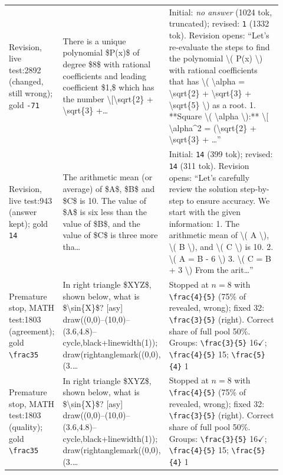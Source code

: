 \begin{tabular}{@{}>{\raggedright\arraybackslash}p{0.16\linewidth}>{\raggedright\arraybackslash}p{0.28\linewidth}>{\raggedright\arraybackslash}p{0.48\linewidth}@{}}
Revision, live test:2892 (changed, still wrong); gold \texttt{-71} & There is a unique polynomial \$P(x)\$ of degree \$8\$ with rational coefficients and leading coefficient \$1,\$ which has the number \textbackslash{}[\textbackslash{}sqrt\{2\} + \textbackslash{}sqrt\{3\} +\ldots & Initial: \textit{no answer} (1024 tok, truncated); revised: \texttt{1} (1332 tok). Revision opens: ``Let's re-evaluate the steps to find the polynomial \textbackslash{}( P(x) \textbackslash{}) with rational coefficients that has \textbackslash{}( \textbackslash{}alpha = \textbackslash{}sqrt\{2\} + \textbackslash{}sqrt\{3\} + \textbackslash{}sqrt\{5\} \textbackslash{}) as a root. 1. **Square \textbackslash{}( \textbackslash{}alpha \textbackslash{}):** \textbackslash{}[ \textbackslash{}alpha\textasciicircum{}2 = (\textbackslash{}sqrt\{2\} + \textbackslash{}sqrt\{3\} + \ldots'' \\
Revision, live test:943 (answer kept); gold \texttt{14} & The arithmetic mean (or average) of \$A\$, \$B\$ and \$C\$ is 10. The value of \$A\$ is six less than the value of \$B\$, and the value of \$C\$ is three more tha\ldots & Initial: \texttt{14} (399 tok); revised: \texttt{14} (311 tok). Revision opens: ``Let's carefully review the solution step-by-step to ensure accuracy. We start with the given information: 1. The arithmetic mean of \textbackslash{}( A \textbackslash{}), \textbackslash{}( B \textbackslash{}), and \textbackslash{}( C \textbackslash{}) is 10. 2. \textbackslash{}( A = B - 6 \textbackslash{}) 3. \textbackslash{}( C = B + 3 \textbackslash{}) From the arit\ldots'' \\ \midrule
Premature stop, MATH test:1803 (agreement); gold \texttt{\textbackslash{}frac35} & In right triangle \$XYZ\$, shown below, what is \$\textbackslash{}sin\{X\}\$? [asy] draw((0,0)--(10,0)--(3.6,4.8)--cycle,black+linewidth(1)); draw(rightanglemark((0,0),(3.\ldots & Stopped at $n=8$ with \texttt{\textbackslash{}frac\{4\}\{5\}} (75\% of revealed, wrong); fixed 32: \texttt{\textbackslash{}frac\{3\}\{5\}} (right). Correct share of full pool 50\%. Groups: \texttt{\textbackslash{}frac\{3\}\{5\}} 16$\checkmark$; \texttt{\textbackslash{}frac\{4\}\{5\}} 15; \texttt{\textbackslash{}frac\{5\}\{4\}} 1 \\
Premature stop, MATH test:1803 (quality); gold \texttt{\textbackslash{}frac35} & In right triangle \$XYZ\$, shown below, what is \$\textbackslash{}sin\{X\}\$? [asy] draw((0,0)--(10,0)--(3.6,4.8)--cycle,black+linewidth(1)); draw(rightanglemark((0,0),(3.\ldots & Stopped at $n=8$ with \texttt{\textbackslash{}frac\{4\}\{5\}} (75\% of revealed, wrong); fixed 32: \texttt{\textbackslash{}frac\{3\}\{5\}} (right). Correct share of full pool 50\%. Groups: \texttt{\textbackslash{}frac\{3\}\{5\}} 16$\checkmark$; \texttt{\textbackslash{}frac\{4\}\{5\}} 15; \texttt{\textbackslash{}frac\{5\}\{4\}} 1 \\

\end{tabular}
